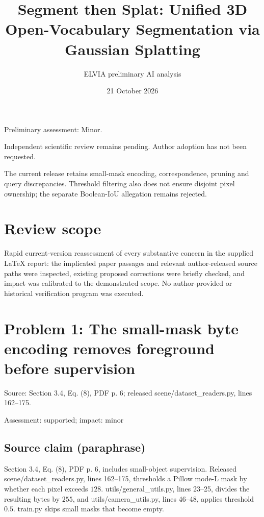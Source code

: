 \documentclass[11pt]{article}
\begin{document}
\title{Segment then Splat: Unified 3D Open-Vocabulary Segmentation via Gaussian Splatting}

\author{ELVIA preliminary AI analysis}\date{21 October 2026}\maketitle

Preliminary assessment: Minor.\par

Independent scientific review remains pending. Author adoption has not been requested.

The current release retains small-mask encoding, correspondence, pruning and query discrepancies. Threshold filtering also does not ensure disjoint pixel ownership; the separate Boolean-IoU allegation remains rejected.

\section*{Review scope}

Rapid current-version reassessment of every substantive concern in the supplied LaTeX report: the implicated paper passages and relevant author-released source paths were inspected, existing proposed corrections were briefly checked, and impact was calibrated to the demonstrated scope. No author-provided or historical verification program was executed.

\section*{Problem 1: The small-mask byte encoding removes foreground before supervision}

Source: Section 3.4, Eq. (8), PDF p. 6; released scene/dataset\_readers.py, lines 162–175.

Assessment: supported; impact: minor

\subsection*{Source claim (paraphrase)}

Section 3.4, Eq. (8), PDF p. 6, includes small-object supervision. Released scene/dataset\_readers.py, lines 162–175, thresholds a Pillow mode-L mask by whether each pixel exceeds \(128\). utils/general\_utils.py, lines 23–25, divides the resulting bytes by \(255\), and utils/camera\_utils.py, lines 46–48, applies threshold \(0.5\). train.py skips small masks that become empty.
\end{document}
